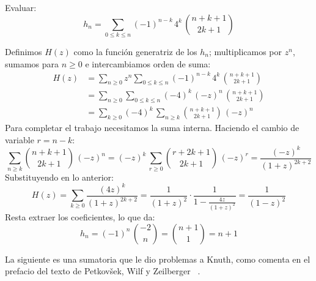   \begin{example}
    Evaluar:
    \begin{equation*}
      h_n
	= \sum_{0 \le k \le n}
	    (-1)^{n - k} \, 4^k \, \binom{n + k + 1}{2 k + 1}
    \end{equation*}

    Definimos \(H(z)\) como la función generatriz de los \(h_n\);
    multiplicamos por \(z^n\),
    sumamos para \(n \ge 0\)
    e intercambiamos orden de suma:
    \begin{align*}
      H(z)
	&= \sum_{n \ge 0} z^n
	     \sum_{0 \le k \le n}
	       (-1)^{n - k} \, 4^k \, \binom{n + k + 1}{2 k + 1} \\
	&= \sum_{n \ge 0}
	     \sum_{0 \le k \le n}
	       (-4)^k \, (-z)^n \, \binom{n + k + 1}{2 k + 1} \\
	&= \sum_{k \ge 0}
	     (-4)^k \,
	     \sum_{n \ge k}
	       \binom{n + k + 1}{2 k + 1} \, (-z)^n
    \end{align*}
    Para completar el trabajo necesitamos la suma interna.
    Haciendo el cambio de variable \(r = n - k\):
    \begin{equation*}
      \sum_{n \ge k} \binom{n + k + 1}{2 k + 1} \, (-z)^n
	= (-z)^k \, \sum_{r \ge 0}
		      \binom{r + 2 k + 1}{2 k + 1} \, (-z)^r
	= \frac{(-z)^k}{(1 + z)^{2 k + 2}}
    \end{equation*}
    Substituyendo en lo anterior:
    \begin{equation*}
      H(z)
	= \sum_{k \ge 0} \frac{(4 z)^k}{(1 + z)^{2 k + 2}}
	= \frac{1}{(1 + z)^2}
	    \cdot \frac{1}{1 - \frac{4 z}{(1 + z)^2}}
	= \frac{1}{(1 - z)^2}
    \end{equation*}
    Resta extraer los coeficientes,
    lo que da:
    \begin{equation*}
      h_n
	= (-1)^n \, \binom{-2}{n}
	= \binom{n + 1}{1}
	= n + 1
    \end{equation*}
  \end{example}
  La siguiente es una sumatoria que le dio problemas a Knuth,%
  como comenta en el prefacio
  del texto de Petkovšek, Wilf y Zeilberger~%
    \cite{petkovsek96:_AeqB}.
